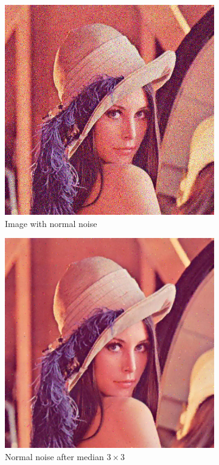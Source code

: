 \documentclass[12pt]{article}
\theoremstyle{definition}
\begin{document}
\begin{figure}[ht]
    \begin{subfigure}[t]{.4\textwidth}\centering
        \includegraphics[width=.8\textwidth]{lenac_normal3}
        \caption{Image with normal noise}
    \end{subfigure}
    \begin{subfigure}[t]{.4\textwidth}\centering
        \includegraphics[width=.8\textwidth]{lenac_normal_median}
        \caption{Normal noise after median $3\times3$}
    \end{subfigure}\\[2em]
    \begin{subfigure}[t]{.4\textwidth}\centering

\end{subfigure}
\end{figure}
\end{document}
